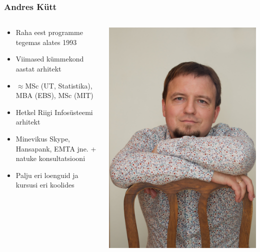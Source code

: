 \begin{frame}[fragile]
	\frametitle{Andres Kütt}
	\begin{columns}[t]
		\begin{column}{7cm}
			\begin{itemize}
				\item Raha eest programme tegemas alates 1993
				\item Viimased kümmekond aastat arhitekt
				\item $\approx$MSc (UT, Statistika), MBA (EBS), MSc (MIT)
				\item Hetkel Riigi Infosüsteemi arhitekt
				\item Minevikus Skype, Hansapank, EMTA jne. + natuke konsultatsiooni
				\item Palju eri loenguid ja kursusi eri koolides
			\end{itemize}
		\end{column}
		\begin{column}[T]{3cm}
			\includegraphics[width=\textwidth]{author.jpg}
		\end{column}
	\end{columns}
\end{frame}


